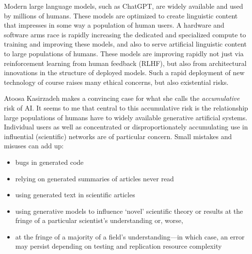 \documentclass[11pt, oneside]{article}   	%
\begin{document}
Modern large language models, such as ChatGPT, are widely available and used by millions of humans.  These models are optimized to create linguistic content that impresses in some way a population of human users.  A hardware and software arms race is rapidly increasing the dedicated and specialized compute to training and improving these models, and also to serve artificial linguistic content to large populations of humans.  These models are improving rapidly not just via reinforcement learning from human feedback (RLHF), but also from architectural innovations in the structure of deployed models.  Such a rapid deployment of new technology of course raises many ethical concerns, but also existential risks.




Atoosa Kasirzadeh makes a convincing case for what she calls the \emph{accumulative} risk of AI. \citep{Kasirzadeh2024WIP}  It seems to me that central to this accumulative risk is the relationship large populations of humans have to widely available generative artificial systems.  Individual users as well as concentrated or disproportionately accumulating use in influential (scientific) networks are of particular concern.  Small mistakes and misuses can add up: 

\begin{itemize}
    \item bugs in generated code
    \item relying on generated summaries of articles never read
    \item using generated text in scientific articles
    \item using generative models to influence `novel' scientific theory or results at the fringe of a particular scientist's understanding or, worse, 
    \item at the fringe of a majority of a field's understanding---in which case, an error may persist depending on testing and replication resource complexity
\end{itemize}
\end{document}
